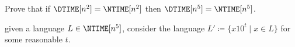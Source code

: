 Prove that if $\DTIME[n^2] = \NTIME[n^2]$ then $\DTIME[n^5] = \NTIME[n^5]$.

 given a language $L \in \NTIME[n^5]$, consider the language $L' \coloneqq \{x10^{t} \mid
x \in L\}$ for some reasonable $t$.